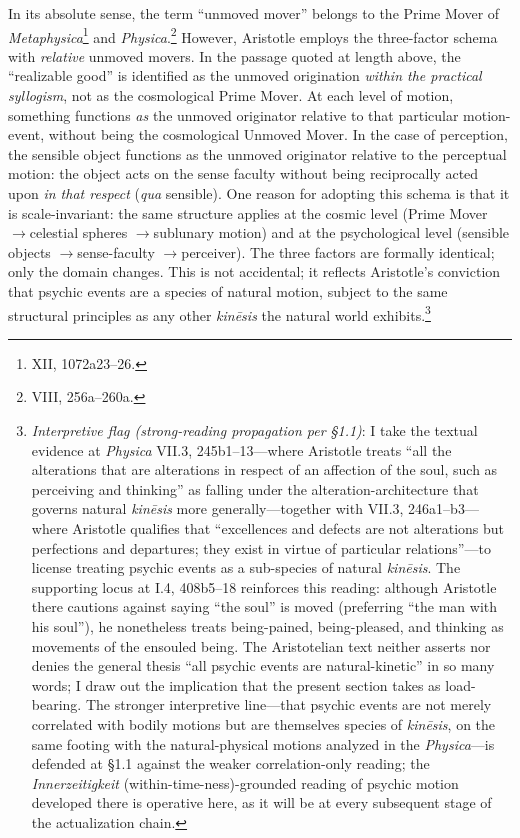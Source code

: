 \documentclass{article}
\newcommand{\ra}{\ensuremath{\rightarrow}}
\begin{document}
In its absolute sense, the term ``unmoved mover'' belongs to the Prime Mover of \textit{Metaphysica}\footnote{XII, 1072a23--26.} and \textit{Physica}.\footnote{VIII, 256a--260a.} However, Aristotle employs the three-factor schema with \textit{relative} unmoved movers. In the passage quoted at length above, the ``realizable good'' is identified as the unmoved origination \textit{within the practical syllogism}, not as the cosmological Prime Mover. At each level of motion, something functions \textit{as} the unmoved originator relative to that particular motion-event, without being the cosmological Unmoved Mover. In the case of perception, the sensible object functions as the unmoved originator relative to the perceptual motion: the object acts on the sense faculty without being reciprocally acted upon \textit{in that respect} (\textit{qua} sensible). One reason for adopting this schema is that it is scale-invariant: the same structure applies at the cosmic level (Prime Mover \ra celestial spheres \ra sublunary motion) and at the psychological level (sensible objects \ra sense-faculty \ra perceiver). The three factors are formally identical; only the domain changes. This is not accidental; it reflects Aristotle's conviction that psychic events are a species of natural motion, subject to the same structural principles as any other \textit{kinēsis} the natural world exhibits.\footnote{\textit{Interpretive flag (strong-reading propagation per \S 1.1)}: I take the textual evidence at \textit{Physica} VII.3, 245b1--13---where Aristotle treats ``all the alterations that are alterations in respect of an affection of the soul, such as perceiving and thinking'' as falling under the alteration-architecture that governs natural \textit{kinēsis} more generally---together with VII.3, 246a1--b3---where Aristotle qualifies that ``excellences and defects are not alterations but perfections and departures; they exist in virtue of particular relations''---to license treating psychic events as a sub-species of natural \textit{kinēsis}. The supporting locus at \cite{aristotle2014soul} I.4, 408b5--18 reinforces this reading: although Aristotle there cautions against saying ``the soul'' is moved (preferring ``the man with his soul''), he nonetheless treats being-pained, being-pleased, and thinking as movements of the ensouled being. The Aristotelian text neither asserts nor denies the general thesis ``all psychic events are natural-kinetic'' in so many words; I draw out the implication that the present section takes as load-bearing. The stronger interpretive line---that psychic events are not merely correlated with bodily motions but are themselves species of \textit{kinēsis}, on the same footing with the natural-physical motions analyzed in the \textit{Physica}---is defended at \S 1.1 against the weaker correlation-only reading; the \textit{Innerzeitigkeit} (within-time-ness)-grounded reading of psychic motion developed there is operative here, as it will be at every subsequent stage of the actualization chain.}
\end{document}

